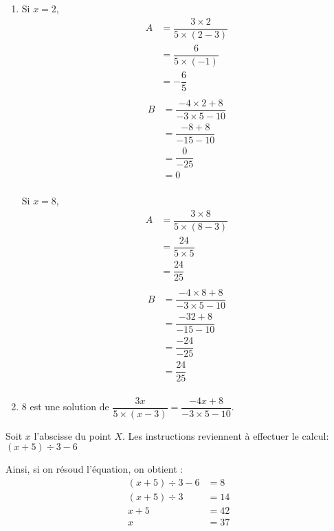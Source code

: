 \documentclass[noheader]{évaluation}
\begin{document}
\begin{exercice}
	\begin{enumerate}
		\item  \begin{multicols}{3}
			      Si $x = 2$,
			      \columnbreak
			      \begin{align*}
				      A & = \dfrac{3 × 2}{5 × (2 - 3)} \\
				        & = \dfrac{6}{5 × (-1)}        \\
				        & = -\dfrac{6}{5}              \\
			      \end{align*}
			      \columnbreak
			      \begin{align*}
				      B & = \dfrac{-4 × 2 + 8}{-3 × 5 - 10} \\
				        & = \dfrac{-8 + 8}{-15 - 10}        \\
				        & = \dfrac{0}{-25}                  \\
				        & = 0                               \\
			      \end{align*}
		      \end{multicols}


		      \begin{multicols}{3}
			      Si $x = 8$,
			      \columnbreak
			      \begin{align*}
				      A & = \dfrac{3 × 8}{5 × (8 - 3)} \\
				        & = \dfrac{24}{5 × 5}          \\
				        & = \dfrac{24}{25}             \\
			      \end{align*}
			      \columnbreak
			      \begin{align*}
				      B & = \dfrac{-4 × 8 + 8}{-3 × 5 - 10} \\
				        & = \dfrac{-32 + 8}{-15 - 10}       \\
				        & = \dfrac{-24}{-25}                \\
				        & = \dfrac{24}{25}                  \\
			      \end{align*}
		      \end{multicols}
		\item $8$ est une solution de $\dfrac{3x}{5 × (x - 3)} = \dfrac{-4x + 8}{-3 × 5 - 10}$.
	\end{enumerate}
\end{exercice}

\begin{exercice}
	Soit $x$ l'abscisse du point $X$. Les instructions reviennent à effectuer le calcul: $ (x + 5) ÷ 3 - 6 $

	Ainsi, si on résoud l'équation, on obtient :
	\begin{align*}
		(x + 5) ÷ 3 - 6 & = 8  \\
		(x + 5) ÷ 3     & = 14 \\
		x + 5           & = 42 \\
		x               & = 37
	\end{align*}
\end{exercice}
\end{document}
